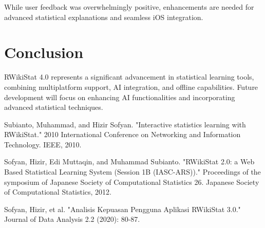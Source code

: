 \documentclass[conference,a4paper]{IEEEtran}
\begin{document}
While user feedback was overwhelmingly positive, enhancements are needed for
advanced statistical explanations and seamless iOS integration.

\section{Conclusion}
\label{sect:conclusion}

RWikiStat 4.0 represents a significant advancement in statistical learning
tools, combining multiplatform support, AI integration, and offline
capabilities. Future development will focus on enhancing AI functionalities and
incorporating advanced statistical techniques.

\balance

\begin{thebibliography}{00}
  Subianto, Muhammad, and Hizir Sofyan. "Interactive statistics learning with RWikiStat." 2010 International Conference on Networking and Information Technology. IEEE, 2010.

  Sofyan, Hizir, Edi Muttaqin, and Muhammad Subianto. "RWikiStat 2.0: a Web Based Statistical Learning System (Session 1B (IASC-ARS))." Proceedings of the symposium of Japanese Society of Computational Statistics 26. Japanese Society of Computational Statistics, 2012.

  Sofyan, Hizir, et al. "Analisis Kepuasan Pengguna Aplikasi RWikiStat 3.0." Journal of Data Analysis 2.2 (2020): 80-87.

\end{thebibliography}
\end{document}
